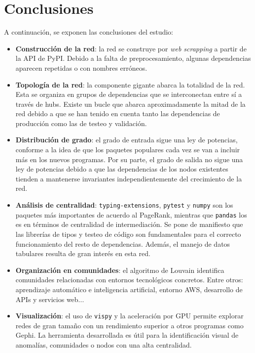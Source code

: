 \documentclass[12pt,a4paper]{report}
\begin{document}
	\chapter{Conclusiones}
	A continuación, se exponen las conclusiones del estudio:
	
	\begin{itemize}
		\item \textbf{Construcción de la red}: la red se construye por \textit{web scrapping} a partir de la API de PyPI. Debido a la falta de preprocesamiento, algunas dependencias aparecen repetidas o con nombres erróneos.
		
		\item \textbf{Topología de la red}: la componente gigante abarca la totalidad de la red. Esta se organiza en grupos de dependencias que se interconectan entre sí a través de hubs. Existe un bucle que abarca aproximadamente la mitad de la red debido a que se han tenido en cuenta tanto las dependencias de producción como las de testeo y validación.
		
		\item \textbf{Distribución de grado}: el grado de entrada sigue una ley de potencias, conforme a la idea de que los paquetes populares cada vez se van a incluir más en los nuevos programas. Por su parte, el grado de salida no sigue una ley de potencias debido a que las dependencias de los nodos existentes tienden a mantenerse invariantes independientemente del crecimiento de la red.
		
		\item \textbf{Análisis de centralidad}: \texttt{typing-extensions}, \texttt{pytest} y \texttt{numpy} son los paquetes más importantes de acuerdo al PageRank, mientras que \texttt{pandas} los es en términos de centralidad de intermediación. Se pone de manifiesto que las librerías de tipos y testeo de código son fundamentales para el correcto funcionamiento del resto de dependencias. Además, el manejo de datos tabulares resulta de gran interés en esta red.
		
		\item \textbf{Organización en comunidades}: el algoritmo de Louvain identifica comunidades relacionadas con entornos tecnológicos concretos. Entre otros: aprendizaje automático e inteligencia artificial, entorno AWS, desarrollo de APIs y servicios web...
		
		\item \textbf{Visualización}: el uso de \texttt{vispy} y la aceleración por GPU permite explorar redes de gran tamaño con un rendimiento superior a otros programas como Gephi. La herramienta desarrollada es útil para la identificación visual de anomalías, comunidades o nodos con una alta centralidad.
	\end{itemize}
	
\end{document}
